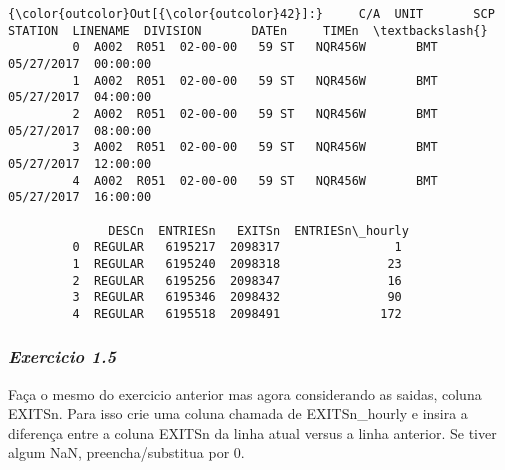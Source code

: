 \documentclass[11pt]{article}
\begin{document}
\begin{Verbatim}[commandchars=\\\{\}]
{\color{outcolor}Out[{\color{outcolor}42}]:}     C/A  UNIT       SCP STATION  LINENAME  DIVISION       DATEn     TIMEn  \textbackslash{}
         0  A002  R051  02-00-00   59 ST   NQR456W       BMT  05/27/2017  00:00:00   
         1  A002  R051  02-00-00   59 ST   NQR456W       BMT  05/27/2017  04:00:00   
         2  A002  R051  02-00-00   59 ST   NQR456W       BMT  05/27/2017  08:00:00   
         3  A002  R051  02-00-00   59 ST   NQR456W       BMT  05/27/2017  12:00:00   
         4  A002  R051  02-00-00   59 ST   NQR456W       BMT  05/27/2017  16:00:00   
         
              DESCn  ENTRIESn   EXITSn  ENTRIESn\_hourly  
         0  REGULAR   6195217  2098317                1  
         1  REGULAR   6195240  2098318               23  
         2  REGULAR   6195256  2098347               16  
         3  REGULAR   6195346  2098432               90  
         4  REGULAR   6195518  2098491              172  
\end{Verbatim}
            
    \subsubsection{\texorpdfstring{\emph{Exercicio
1.5}}{Exercicio 1.5}}\label{exercicio-1.5}

Faça o mesmo do exercicio anterior mas agora considerando as saidas,
coluna EXITSn. Para isso crie uma coluna chamada de EXITSn\_hourly e
insira a diferença entre a coluna EXITSn da linha atual versus a linha
anterior. Se tiver algum NaN, preencha/substitua por 0.
\end{document}
